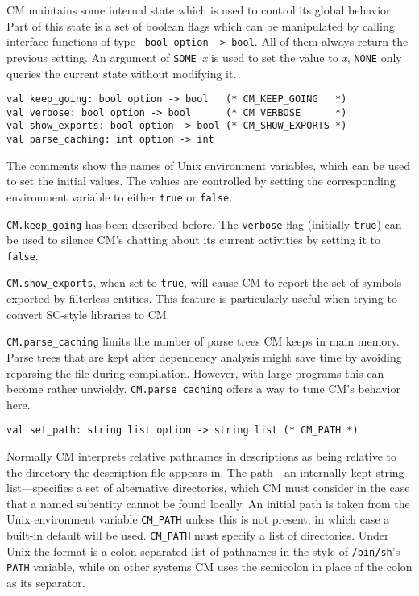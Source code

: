 \documentclass{article}
\begin{document}
CM maintains some internal state which is used to control its global
behavior.  Part of this state is a set of boolean flags which can be
manipulated by calling interface functions of type {\tt
bool~option~->~bool}.  All of them always return the previous setting.
An argument of {\tt SOME}~{\it x} is used to set the value to {\it x},
{\tt NONE} only queries the current state without modifying it.
\begin{verbatim}
val keep_going: bool option -> bool   (* CM_KEEP_GOING   *)
val verbose: bool option -> bool      (* CM_VERBOSE      *)
val show_exports: bool option -> bool (* CM_SHOW_EXPORTS *)
val parse_caching: int option -> int
\end{verbatim}
The comments show the names of {\sc Unix} environment variables, which
can be used to set the initial values.  The values are controlled by
setting the corresponding environment variable to either {\tt true} or
{\tt false}.

\verb|CM.keep_going| has been described before.  The {\tt verbose}
flag (initially {\tt true}) can be used to silence CM's chatting about
its current activities by setting it to {\tt false}.

\verb|CM.show_exports|, when set to {\tt true}, will cause CM to
report the set of symbols exported by filterless entities.  This
feature is particularly useful when trying to convert SC-style
libraries to CM.

\verb|CM.parse_caching| limits the number of parse trees CM keeps in
main memory.  Parse trees that are kept after dependency analysis
might save time by avoiding reparsing the file during compilation.
However, with large programs this can become rather unwieldy.
\verb|CM.parse_caching| offers a way to tune CM's behavior here.

\begin{verbatim}
val set_path: string list option -> string list (* CM_PATH *)
\end{verbatim}

Normally CM interprets relative pathnames in descriptions as being
relative to the directory the description file appears in.  The
path---an internally kept string list---specifies a set of alternative
directories, which CM must consider in the case that a named subentity
cannot be found locally.  An initial path is taken from the {\sc Unix}
environment variable \verb|CM_PATH| unless this is not present, in
which case a built-in default will be used.  \verb|CM_PATH| must
specify a list of directories. Under Unix the format is a
colon-separated list of pathnames in the style of {\tt /bin/sh}'s {\tt
PATH} variable, while on other systems CM uses the semicolon in place
of the colon as its separator.
\end{document}
